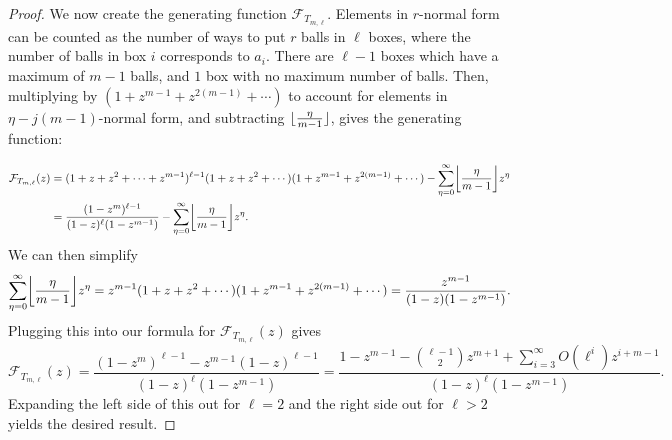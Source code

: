\documentclass{daj}
\theoremstyle{definition}
\theoremstyle{remark}
\numberwithin{equation}{section}
\numberwithin{theorem}{section}
\newcommand{\calf}{\mathcal{F}}
\DeclarePairedDelimiter{\floor}{\lfloor}{\rfloor}
\begin{document}
\begin{proof}
    We now create the generating function $\calf_{T_{m,\ell}}$. Elements in $r$-normal form can be counted as the number of ways to put $r$ balls in $\ell$ boxes, where the number of balls in box $i$ corresponds to $a_i$. There are $\ell-1$ boxes which have a maximum of $m-1$ balls, and $1$ box with no maximum number of balls. Then, multiplying by $(1+z^{m-1}+z^{2(m-1)}+\cdots)$ to account for elements in $\eta -j(m-1)$-normal form, and subtracting $\floor{\frac{\eta }{m-1}}$, gives the generating function:

    
   \begin{align*}
        \calf_{T_{m,\ell}}(z) &= (1+z+z^2+\cdots+z^{m-1})^{\ell-1}(1+z+z^2+\cdots)(1+z^{m-1}+z^{2(m-1)}+\cdots) - \sum_{\eta =0}^\infty \floor*{\frac{\eta }{m-1}} z^\eta \\&= \frac{(1-z^m)^{\ell-1}}{(1-z)^\ell(1-z^{m-1})}- \sum_{\eta =0}^\infty \floor*{\frac{\eta }{m-1}} z^\eta .
    \end{align*}
    We can then simplify \[\sum_{\eta =0}^\infty \floor*{\frac{\eta }{m-1}} z^\eta  = z^{m-1}(1+z+z^2+\cdots)(1+z^{m-1}+z^{2(m-1)} + \cdots) = \frac{z^{m-1}}{(1-z)(1-z^{m-1})}.\] Plugging this into our formula for $\calf_{T_{m,\ell}}(z)$ gives \[\calf_{T_{m,\ell}}(z) = \frac{(1-z^m)^{\ell-1}-z^{m-1}(1-z)^{\ell-1}}{(1-z)^\ell(1-z^{m-1})} = \frac{1-z^{m-1} -\binom{\ell-1}{2}z^{m+1} +\sum_{i=3}^{\infty}O(\ell^i)z^{i+m-1}}{(1-z)^\ell(1-z^{m-1})}.\] Expanding the left side of this out for $\ell = 2$ and the right side out for $\ell > 2$ yields the desired result.
\end{proof}
\end{document}
